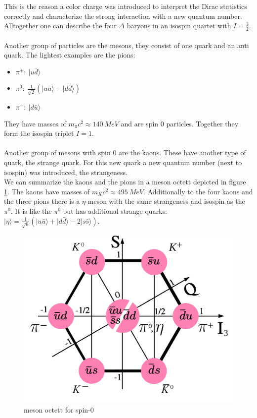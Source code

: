 \documentclass{include/thesisclass}
\newcommand{\rk}{\rangle}
\begin{document}
This is the reason a color charge was introduced to interpret the Dirac statistics correctly and characterize the strong interaction with a new quantum number.\\
Alltogether one can describe the four $\Delta$ baryons in an isospin quartet with $I = \frac{3}{2}$.\\
\\
Another group of particles are the mesons, they consist of one quark and an anti quark. The lightest examples are the pions:
\begin{itemize}
\item $\pi^+:~|u\bar{d}\rk$
\item $\pi^0:~\frac{1}{\sqrt{2}}\left( |u\bar{u}\rk - |d \bar{d}\rk\right)$
\item $\pi^-:~|d\bar{u}\rk$
\end{itemize}
They have masses of $m_\pi c^2 \approx 140~\si{MeV}$ and are spin $0$ particles. Together they form the isospin triplet $I = 1$.\\
\\
Another group of mesons with spin $0$ are the kaons. These have another type of quark, the strange quark. For this new quark a new quantum number (next to isospin) was introduced, the strangeness.\\
We can summarize the kaons and the pions in a meson octett depicted in figure \ref{1}. The kaons have masses of $m_Kc^2 \approx 495~\si{MeV}$. Additionally to the four kaons and the three pions there is a $\eta$-meson with the same strangeness and isospin as the $\pi^0$. It is like the $\pi^0$ but has additional strange quarks: $|\eta\rk = \frac{1}{\sqrt{6}}\left( |u\bar{u}\rk + |d\bar{d}\rk - 2 | s \bar{s}\rk\right)$.\\
\begin{figure}[H]
\centering
\includegraphics[scale=0.1]{include/mesonoctett.pdf}
\caption{meson octett for spin-$0$}
\label{1}
\end{figure}
\end{document}
